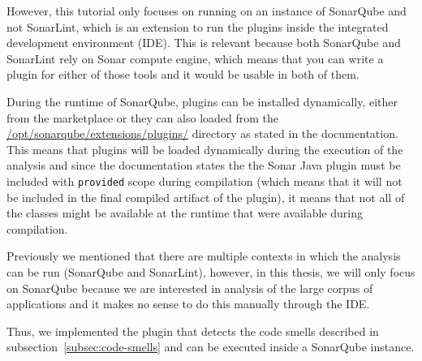 However, this tutorial only focuses on running on an instance of SonarQube and not SonarLint, which is an
extension to run the plugins inside the integrated development environment (IDE).
This is relevant because both SonarQube and SonarLint rely on Sonar compute engine, which means that you can write
a plugin for either of those tools and it would be usable in both of them.

During the runtime of SonarQube, plugins can be installed dynamically, either from the marketplace or they can
also loaded from the \url{/opt/sonarqube/extensions/plugins/} directory as stated in the documentation.
This means that plugins will be loaded dynamically during the execution of the analysis and since the documentation
states the the Sonar Java plugin must be included with \verb|provided| scope during compilation (which means that it
will not be included in the final compiled artifact of the plugin), it means that not all of the classes might be
available at the runtime that were available during compilation.


Previously we mentioned that there are multiple contexts in which the analysis can be run (SonarQube and SonarLint),
however, in this thesis, we will only focus on SonarQube because we are interested in analysis of the large corpus
of applications and it makes no sense to do this manually through the IDE\@.

Thus, we implemented the plugin that detects the code smells described in subsection~\ref{subsec:code-smells} and
can be executed inside a SonarQube instance.


